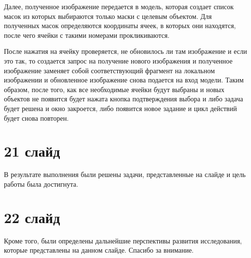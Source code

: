 \documentclass{altsu-report}
\begin{document}
Далее, полученное изображение передается в модель, которая создает список масок 
из которых выбираются только маски с целевым объектом. Для полученных масок 
определяются координаты ячеек, в которых они находятся, после чего ячейки с 
такими номерами прокликиваются.

После нажатия на ячейку проверяется, не обновилось ли там изображение и если это 
так, то создается запрос на получение нового изображения и полученное изображение 
заменяет собой соответствующий фрагмент на локальном изображении и обновленное 
изображение снова подается на вход модели. Таким образом, после того, как все 
необходимые ячейки будут выбраны и новых объектов не появится будет нажата кнопка 
подтверждения выбора и либо задача будет решена и окно закроется, либо появится 
новое задание и цикл действий будет снова повторен.

\section*{21 слайд}

В результате выполнения были решены задачи, представленные на слайде и цель 
работы была достигнута.

\section*{22 слайд}

Кроме того, были определены дальнейшие перспективы развития исследования, которые 
представлены на данном слайде. Спасибо за внимание.
\end{document}
